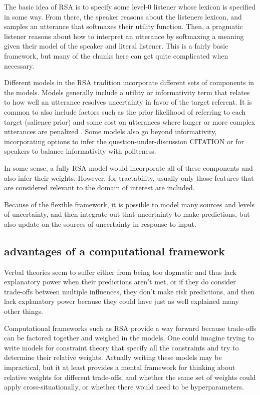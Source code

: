 \documentclass[]{article}
\begin{document}
The basic idea of RSA is to specify some level-0 listener whose lexicon is specified in some way. From there, the speaker reasons about the listeners lexicon, and samples an utterance that softmaxes their utility function. Then, a pragmatic listener reasons about how to interpret an utterance by softmaxing a meaning given their model of the speaker and literal listener. This is a fairly basic framework, but many of the chunks here can get quite complicated when necessary. 

Different models in the RSA tradition incorporate different sets of components in the models. Models generally include a utility or informativity term that relates to how well an utterance resolves uncertainty in favor of the target referent.  It is common to also include factors such as the prior likelihood of referring to each target (salience prior) and some cost on utterances where longer or more complex utterances are penalized \cite{goodman2016}. Some models also go beyond informativity, incorporating options to infer the question-under-discussion CITATION or for speakers to balance informativity with politeness.

In some sense, a fully RSA model would incorporate all of these components and also infer their weights. However, for tractability, usually only those features that are considered relevant to the domain of interest are included.

Because of the flexible framework, it is possible to model many sources and levels of uncertainty, and then integrate out that uncertainty to make predictions, but also update on the sources of uncertainty in response to input. 

\subsection{advantages of a computational framework}

Verbal theories seem to suffer either from being too dogmatic and thus lack explanatory power when their predictions aren't met, or if they do consider trade-offs between multiple influences, they don't make risk predictions, and then lack explanatory power because they could have just as well explained many other things. 

Computational frameworks such as RSA provide a way forward because trade-offs can be factored together and weighed in the models. One could imagine trying to write models for constraint theory that specify all the constraints and try to determine their relative weights. Actually writing these models may be impractical, but it at least provides a mental framework for thinking about relative weights for different trade-offs, and whether the same set of weights could apply cross-situationally, or whether there would need to be hyperparameters. 
\end{document}
